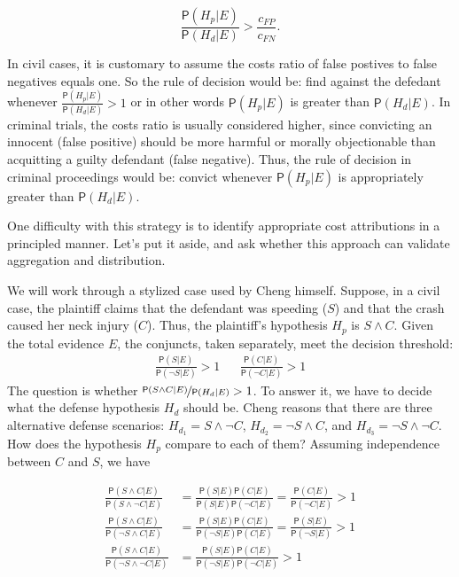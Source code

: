 \documentclass[
  10pt,
  dvipsnames,enabledeprecatedfontcommands]{scrartcl}
\newcommand{\n}{\neg}
\newcommand{\et}{\wedge}
\newcommand{\pr}[1]{\mathsf{P}(#1)}
\begin{document}
\[\frac{\pr{H_p \vert E}}{\pr{H_d \vert E}} > \frac{c_{FP}}{c_{FN}}.\]

\noindent In civil cases, it is customary to assume the costs ratio of
false postives to false negatives equals one. So the rule of decision
would be: find against the defedant whenever
\(\frac{\pr{H_p \vert E}}{\pr{H_d \vert E}} > 1\) or in other words
\(\pr{H_p \vert E}\) is greater than \(\pr{H_d \vert E}\). In criminal
trials, the costs ratio is usually considered higher, since convicting
an innocent (false positive) should be more harmful or morally
objectionable than acquitting a guilty defendant (false negative). Thus,
the rule of decision in criminal proceedings would be: convict whenever
\(\pr{H_p \vert E}\) is appropriately greater than \(\pr{H_d \vert E}\).

One difficulty with this strategy is to identify appropriate cost
attributions in a principled manner. Let's put it aside, and ask whether
this approach can validate aggregation and distribution.

We will work through a stylized case used by Cheng himself. Suppose, in
a civil case, the plaintiff claims that the defendant was speeding
(\(S\)) and that the crash caused her neck injury (\(C\)). Thus, the
plaintiff's hypothesis \(H_p\) is \(S\et C\). Given the total evidence
\(E\), the conjuncts, taken separately, meet the decision threshold:
\begin{align}
 \nonumber 
 \frac{\pr{S\vert E}}{\pr{\neg S \vert E}} > 1   & & \frac{\pr{C\vert E}}{\pr{\neg C \vert E}} > 1
\end{align} \noindent The question is whether
\(\nicefrac{\pr{S\et C\vert E}}{\pr{H_d \vert E}}>1\). To answer it, we
have to decide what the defense hypothesis \(H_d\) should be. Cheng
reasons that there are three alternative defense scenarios:
\(H_{d_1}= S\et \n C\), \(H_{d_2}=\n S \et C\), and
\(H_{d_3}=\n S \et \n C\). How does the hypothesis \(H_p\) compare to
each of them? Assuming independence between \(C\) and \(S\), we have

\begin{align}\label{eq:cheng-multiplication}
\frac{\pr{S\et C\vert E}}{\pr{S\et \n C\vert E}} & = \frac{\pr{S\vert E}\pr{C\vert E}}{\pr{S \vert E}\pr{\n C \vert E}}  =\frac{\pr{C\vert E}}{\pr{\n C \vert E}} > 1 \\
\nonumber
\frac{\pr{S\et C\vert E}}{\pr{\n S\et C\vert E}} & = \frac{\pr{S\vert E}\pr{C\vert E}}{\pr{\n S \vert E}\pr{C\vert E}}  = \frac{\pr{S\vert E}}{\pr{\n S \vert E}} > 1 \\
\nonumber
\frac{\pr{S\et C\vert E}}{\pr{\n S\et \n C\vert E}} & = \frac{\pr{S\vert E}\pr{C\vert E}}{\pr{\n S \vert E}\pr{\n C \vert E}}   > 1 
\end{align}
\end{document}
